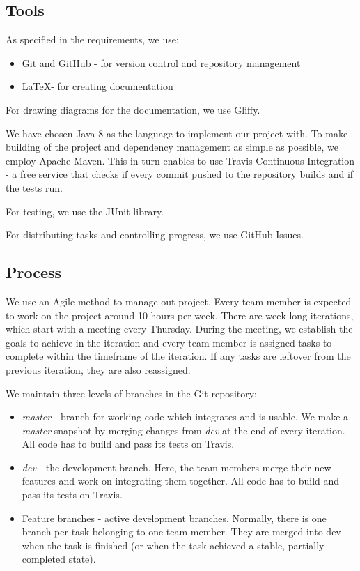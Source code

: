 \documentclass[a4paper,12pt]{article}
\begin{document}
\subsection{Tools}
As specified in the requirements, we use:
\begin{itemize}
    \item{Git and GitHub - for version control and repository management}
    \item{\LaTeX - for creating documentation}
\end{itemize}

For drawing diagrams for the documentation, we use Gliffy.

We have chosen Java 8 as the language to implement our project with. To make building of the project and dependency management as simple as possible, we employ Apache Maven. This in turn enables to use Travis Continuous Integration - a free service that checks if every commit pushed to the repository builds and if the tests run.

For testing, we use the JUnit library.

For distributing tasks and controlling progress, we use GitHub Issues.

\subsection{Process}
We use an Agile method to manage out project. Every team member is expected to work on the project around 10 hours per week. There are week-long iterations, which start with a meeting every Thursday. During the meeting, we establish the goals to achieve in the iteration and every team member is assigned tasks to complete within the timeframe of the iteration. If any tasks are leftover from the previous iteration, they are also reassigned.

We maintain three levels of branches in the Git repository:
\begin{itemize}
    \item{\emph{master} - branch for working code which integrates and is usable. We make a \emph{master} snapshot by merging changes from \emph{dev} at the end of every iteration. All code has to build and pass its tests on Travis.}
    \item{\emph{dev} - the development branch. Here, the team members merge their new features and work on integrating them together. All code has to build and pass its tests on Travis.}
    \item{Feature branches - active development branches. Normally, there is one branch per task belonging to one team member. They are merged into dev when the task is finished (or when the task achieved a stable, partially completed state).}
\end{itemize}
\end{document}
